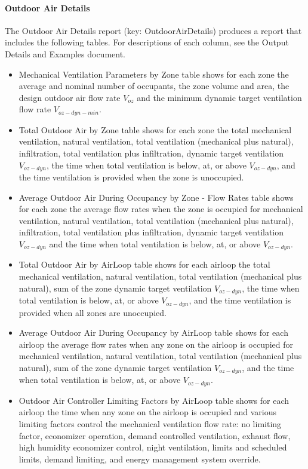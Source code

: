 \paragraph{Outdoor Air Details}\label{outdoor-air-details}

The Outdoor Air Details report (key: OutdoorAirDetails) produces a report that includes the following tables. For descriptions of each column, see the Output Details and Examples document.

\begin{itemize}
\item
  Mechanical Ventilation Parameters by Zone table shows for each zone the average and nominal number of occupants, the zone volume and area, the design outdoor air flow rate \(V_{oz}\) and the minimum dynamic target ventilation flow rate \(V_{oz-dyn-min}\).
\item
  Total Outdoor Air by Zone table shows for each zone the total mechanical ventilation, natural ventilation, total ventilation (mechanical plus natural), infiltration, total ventilation plus infiltration, dynamic target ventilation \(V_{oz-dyn}\), the time when total ventilation is below, at, or above \(V_{oz-dyn}\), and the time ventilation is provided when the zone is unoccupied.
\item
  Average Outdoor Air During Occupancy by Zone - Flow Rates table shows for each zone the average flow rates when the zone is occupied for mechanical ventilation, natural ventilation, total ventilation (mechanical plus natural), infiltration, total ventilation plus infiltration, dynamic target ventilation \(V_{oz-dyn}\) and the time when total ventilation is below, at, or above \(V_{oz-dyn}\).
\item
  Total Outdoor Air by AirLoop table shows for each airloop the total mechanical ventilation, natural ventilation, total ventilation (mechanical plus natural), sum of the zone dynamic target ventilation \(V_{oz-dyn}\), the time when total ventilation is below, at, or above \(V_{oz-dyn}\), and the time ventilation is provided when all zones are unoccupied.
\item
  Average Outdoor Air During Occupancy by AirLoop table shows for each airloop the average flow rates when any zone on the airloop is occupied for mechanical ventilation, natural ventilation, total ventilation (mechanical plus natural), sum of the zone dynamic target ventilation \(V_{oz-dyn}\), and the time when total ventilation is below, at, or above \(V_{oz-dyn}\).
\item
  Outdoor Air Controller Limiting Factors by AirLoop table shows for each airloop the time when any zone on the airloop is occupied and various limiting factors control the mechanical ventilation flow rate: no limiting factor, economizer operation, demand controlled ventilation, exhaust flow, high humidity economizer control, night ventilation, limits and scheduled limits, demand limiting, and energy management system override.

\end{itemize}
